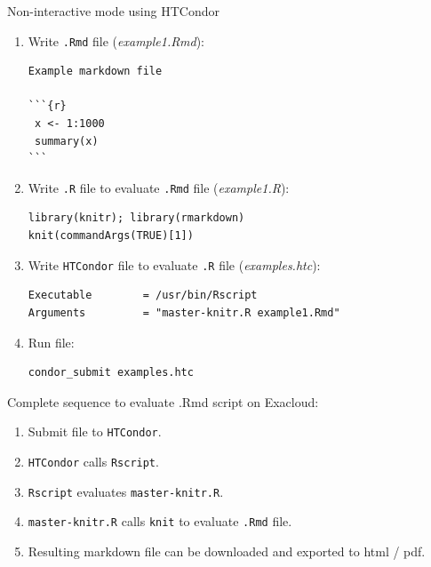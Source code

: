 \documentclass[12pt,t,xcolor=table]{beamer}
\begin{document}
\begin{frame}[fragile,label={sec:orgheadline21}]{Non-interactive mode using HTCondor}
 \vspace{0.5em}

\begin{enumerate}
\item Write \texttt{.Rmd} file (\emph{example1.Rmd}): \setlength\itemsep{0.3em}

\begin{verbatim}
Example markdown file

```{r}
 x <- 1:1000
 summary(x)
```
\end{verbatim}

\item Write \texttt{.R} file to evaluate \texttt{.Rmd} file (\emph{example1.R}): 

\begin{verbatim}
library(knitr); library(rmarkdown)
knit(commandArgs(TRUE)[1])
\end{verbatim}

\item Write \texttt{HTCondor} file to evaluate \texttt{.R} file (\emph{examples.htc}):

\begin{verbatim}
Executable        = /usr/bin/Rscript
Arguments         = "master-knitr.R example1.Rmd"
\end{verbatim}

\item Run file:

\begin{verbatim}
condor_submit examples.htc
\end{verbatim}
\end{enumerate}
\end{frame}

\begin{frame}[fragile,label={sec:orgheadline22}]{Complete sequence to evaluate .Rmd script on Exacloud:}
 \vspace{1.0em}

\begin{enumerate}
\item Submit file to \texttt{HTCondor}.\setlength\itemsep{0.5em}

\item \texttt{HTCondor} calls \texttt{Rscript}.

\item \texttt{Rscript} evaluates \texttt{master-knitr.R}.

\item \texttt{master-knitr.R} calls \texttt{knit} to evaluate \texttt{.Rmd} file.

\item Resulting markdown file can be downloaded and exported to html / pdf.
\end{enumerate}
\end{frame}
\end{document}
